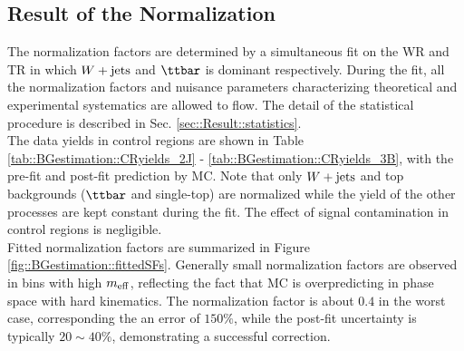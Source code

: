 \clearpage

%


%

\subsection{Result of the Normalization} \label{sec::BGestimation::kineExtp::result}
The normalization factors are determined by a simultaneous fit on the WR and TR in which $W+\mathrm{jets}$ and $\ttbar$ is dominant respectively. During the fit, all the normalization factors and nuisance parameters characterizing theoretical and experimental systematics are allowed to flow. The detail of the statistical procedure is described in Sec. \ref{sec::Result::statistics}. \\

The data yields in control regions are shown in Table \ref{tab::BGestimation::CRyields_2J} - \ref{tab::BGestimation::CRyields_3B}, with the pre-fit and post-fit prediction by MC. Note that only $W+\mathrm{jets}$ and top backgrounds ($\ttbar$ and single-top) are normalized while the yield of the other processes are kept constant during the fit. The effect of signal contamination in control regions is negligible. \\

Fitted normalization factors are summarized in Figure \ref{fig::BGestimation::fittedSFs}. 
Generally small normalization factors are observed in bins with high $m_{\mathrm{eff}}$, 
reflecting the fact that MC is overpredicting in phase space with hard kinematics. 
%
The normalization factor is about $0.4$ in the worst case, corresponding the an error of $150\%$, 
while the post-fit uncertainty is typically $20\sim40\%$, 
demonstrating a successful correction. 



